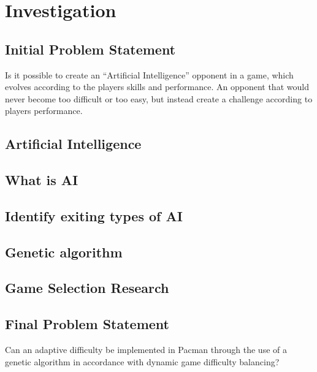 \section{Investigation} \label{sec:preanalysus}

\subsection{Initial Problem Statement} \label{sec:initialproblemstatement}
Is it possible to create an “Artificial Intelligence” opponent in a game, which evolves according to the players skills and performance.  An opponent that would never become too difficult or too easy, but instead create a challenge according to players performance.


\subsection{Artificial Intelligence} \label{sec:ai}
\subsection{What is AI}
\subsection{Identify exiting types of AI}
\subsection{Genetic algorithm}
\subsection{Game Selection Research}


\subsection{Final Problem Statement} \label{sec:finalproblemstatement}
Can an adaptive difficulty 	be implemented in Pacman through the use of a genetic algorithm in accordance with dynamic game difficulty balancing?